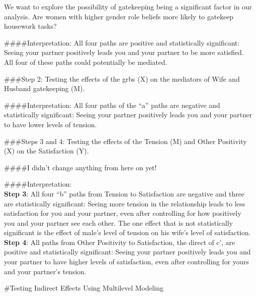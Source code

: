 \documentclass[
  man,floatsintext]{apa6}
\begin{document}
We want to explore the possibility of gatekeeping being a significant factor in our analysis. Are women with higher gender role beliefs more likely to gatekeep housework tasks?

\#\#\#\#Interpretation:
All four paths are positive and statistically significant: Seeing your partner positively leads you and your partner to be more satisfied. All four of these paths could potentially be mediated.

\#\#\#Step 2: Testing the effects of the grbs (X) on the mediators of Wife and Husband gatekeeping (M).

\#\#\#\#Interpretation:
All four paths of the ``a'' paths are negative and statistically significant: Seeing your partner positively leads you and your partner to have lower levels of tension.

\#\#\#Steps 3 and 4: Testing the effects of the Tension (M) and Other Positivity (X) on the Satisfaction (Y).

\#\#\#\#I didn't change anything from here on yet!

\#\#\#\#Interpretation:\\
\textbf{Step 3}: All four ``b'' paths from Tension to Satisfaction are negative and three are statistically significant: Seeing more tension in the relationship leads to less satisfaction for you and your partner, even after controlling for how positively you and your partner see each other. The one effect that is not statistically significant is the effect of male's level of tension on his wife's level of satisfaction.\\
\textbf{Step 4}: All paths from Other Positivity to Satisfaction, the direct of c', are positive and statistically significant: Seeing your partner positively leads you and your partner to have higher levels of satisfaction, even after controlling for yours and your partner's tension.

\#Testing Indirect Effects Using Multilevel Modeling
\end{document}
